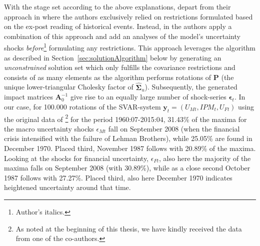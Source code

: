 \documentclass[a4paper,11pt,listof=nochaptergap,oneside,pointednumbers,bibtotoc,bigheadings,liststotoc,hidelinks]{scrbook}
\theoremstyle{mysatz}
\theoremstyle{mydefinition}
\theoremstyle{mytheorem}
\theoremstyle{mybemerkung}
\let\oldhat\hat
\newcommand{\vect}[1]{\boldsymbol{\mathbf{#1}}}
\newcommand{\hatt}[1]{\oldhat{\boldsymbol{\mathbf{#1}}}}
\begin{document}
With the stage set according to the above explanations, \citet{ludvigsonetal:19} depart from their approach in \citet{ludvigsonetal:18} where the authors exclusively relied on restrictions formulated based on the ex-post reading of historical events. Instead, in \citet{ludvigsonetal:19} the authors apply a combination of this approach and add an analyses of the model's uncertainty shocks \textit{before}\footnote{Author's italics.} formulating any restrictions. This approach leverages the algorithm as described in Section~\ref{sec:solutionAlgorithm} below by generating an \textit{unconstrained} solution set which only fulfills the covariance restrictions and consists of as many elements as the algorithm performs rotations of $\vect{P}$ (the unique lower-triangular Cholesky factor of $\hatt{\vect{\Sigma}}_u$). Subsequently, the generated impact matrices $\vect{A}_0^{-1}$ give rise to an equally large number of shock-series $\vect{\epsilon}_t$. In our case, for 100.000 rotations of the SVAR-system $\vect{y}_t = (U_{Mt}, IPM_{t}, U_{Ft})$ using the original data of \citet{ludvigsonetal:18,ludvigsonetal:19}\footnote{As noted at the beginning of this thesis, we have kindly received the data from one of the co-authors.} for the period 1960:07-2015:04, 31.43\% of the maxima for the macro uncertainty shocks $\epsilon_{Mt}$ fall on September 2008 (when the financial crisis intensified with the failure of Lehman Brothers), while 25.05\% are found in December 1970. Placed third, November 1987 follows with 20.89\% of the maxima. Looking at the shocks for financial uncertainty, $\epsilon_{Ft}$, also here the majority of the maxima falls on September 2008 (with 30.89\%), while as a close second October 1987 follows with 27.27\%. Placed third, also here December 1970 indicates heightened uncertainty around that time.
\end{document}
